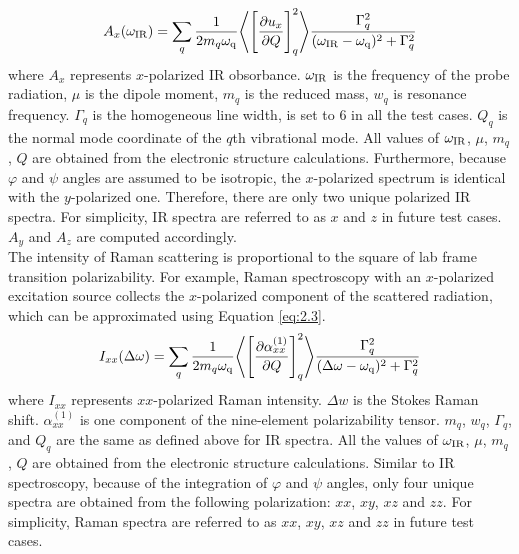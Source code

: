 \begin{equation} \label{eq:2.2}
A_x(\omega_{\rm IR}) = \sum_{q} \frac{1}{2 m_{q} \omega_{\rm q}} \Bigg \langle \Bigg\lbrack \frac{\partial u_x}{\partial Q} \Bigg\rbrack_{q} ^2 \Bigg\rangle \frac{\Gamma_q^2}{(\omega_{\rm IR}-\omega_{\rm q})^2 + \Gamma_q^2}
\end{equation} 
where $A_x$ represents $x$-polarized IR obsorbance. $\omega_{\rm IR}$ is the frequency of the probe radiation, $\mu$ is the dipole moment, $m_q$ is the reduced mass, $w_q$ is resonance frequency. $\Gamma_q$ is the homogeneous line width, is set to $6$ in all the test cases. $Q_q$ is the normal mode coordinate of the $q$th vibrational mode. All values of $\omega_{\rm IR}$, $\mu$, $m_q$, $Q$ are obtained from the electronic structure calculations. Furthermore, because $\varphi$ and $\psi$ angles are assumed to be isotropic, the $x$-polarized spectrum is identical with the $y$-polarized one. Therefore, there are only two unique polarized IR spectra. For simplicity, IR spectra are referred to as $x$ and $z$ in future test cases. $A_y$ and $A_z$ are computed accordingly.\\

The intensity of Raman scattering is proportional to the square of lab frame transition polarizability. For example, Raman spectroscopy with an $x$-polarized excitation source collects the $x$-polarized component of the scattered radiation, which can be approximated using Equation \ref{eq:2.3}. \\

\begin{equation} \label{eq:2.3}
I_{xx}(\Delta \omega) = \sum_{q} \frac{1}{2 m_{q} \omega_{\rm q}} \Bigg \langle \Bigg\lbrack \frac{\partial \alpha_{xx}^{(1)}}{\partial Q} \Bigg\rbrack_{q} ^2 \Bigg\rangle \frac{\Gamma_q^2}{(\Delta \omega-\omega_{\rm q})^2 + \Gamma_q^2}
\end{equation} 
where $I_{xx}$ represents $xx$-polarized Raman intensity. $\Delta w$ is the Stokes Raman shift. $\alpha_{xx}^{(1)}$ is one component of the nine-element polarizability tensor. $m_q$, $w_q$, $\Gamma_q$, and $Q_q$ are the same as defined above for IR spectra. All the values of $\omega_{\rm IR}$, $\mu$, $m_q$, $Q$ are obtained from the electronic structure calculations. Similar to IR spectroscopy, because of the integration of $\varphi$ and $\psi$ angles, only four unique spectra are obtained from the following polarization: $xx$, $xy$, $xz$ and $zz$. For simplicity, Raman spectra are referred to as $xx$, $xy$, $xz$ and $zz$ in future test cases. \\

